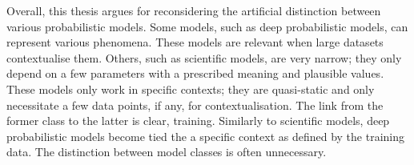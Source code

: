Overall, this thesis argues for reconsidering the artificial distinction between various probabilistic models. Some models, such as deep probabilistic models, can represent various phenomena. These models are relevant when large datasets contextualise them. Others, such as scientific models, are very narrow; they only depend on a few parameters with a prescribed meaning and plausible values. These models only work in specific contexts; they are quasi-static and only necessitate a few data points, if any, for contextualisation. The link from the former class to the latter is clear, training. Similarly to scientific models, deep probabilistic models become tied the a specific context as defined by the training data. The distinction between model classes is often unnecessary.
%
%
%
%




